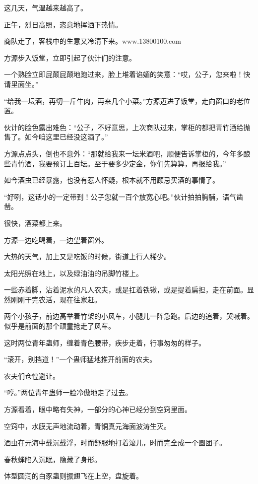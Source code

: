 
\begin{this_body}

这几天，气温越来越高了。

正午，烈日高照，恣意地挥洒下热情。

商队走了，客栈中的生意又冷清下来。www.13800100.com

方源步入饭堂，立即引起了伙计们的注意。

一个熟脸立即屁颠屁颠地跑过来，脸上堆着谄媚的笑意：“哎，公子，您来啦！快请里面坐。”

“给我一坛酒，再切一斤牛肉，再来几个小菜。”方源迈进了饭堂，走向窗口的老位置。

伙计的脸色露出难色：“公子，不好意思，上次商队过来，掌柜的都把青竹酒给抛售了。如今咱这里已经没这酒了。”

方源点点头，倒也不意外：“那就给我来一坛米酒吧，顺便告诉掌柜的，今年多酿些青竹酒，我要预订上百坛。至于要多少定金，你们先算算，再报给我。”

如今酒虫已经暴露，也没有惹人怀疑，根本就不用顾忌买酒的事情了。

“好咧，这话小的一定带到！公子您就一百个放宽心吧。”伙计拍拍胸脯，语气凿凿。

很快，酒菜都上来。

方源一边吃喝着，一边望着窗外。

大热的天气，加上又是吃饭的时候，街道上行人稀少。

太阳光照在地上，以及绿油油的吊脚竹楼上。

一些赤着脚，沾着泥水的凡人农夫，或是扛着铁锹，或是提着扁担，走在前面。显然刚刚干完农活，现在往家赶。

两个小孩子，前边高举着竹架的小风车，小腿儿一阵急跑。后边的追着，哭喊着。似乎是前面的那个顽童抢走了风车。

这时两位青年蛊师，缠着青色腰带，疾步走着，行事匆匆的样子。

“滚开，别挡道！”一个蛊师猛地推开前面的农夫。

农夫们仓惶避让。

“哼。”两位青年蛊师一脸冷傲地走了过去。

方源看着，眼中略有失神，一部分的心神已经分到空窍里面。

空窍中，水膜无声地流动着，青铜真元海面波涛生灭。

酒虫在元海中载沉载浮，时而舒服地打着滚儿，时而完全成一个圆团子。

春秋蝉陷入沉眠，隐藏了身形。

体型圆润的白豕蛊则振翅飞在上空，盘旋着。


\end{this_body}
